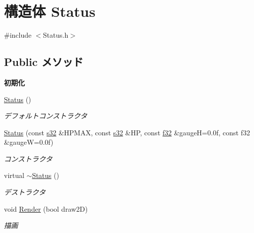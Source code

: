 \hypertarget{struct_status}{\section{構造体 Status}
\label{struct_status}
}


{\ttfamily \#include $<$Status.\-h$>$}

\subsection*{Public メソッド}
\begin{Indent}{\bf 初期化}\par
\begin{DoxyCompactItemize}
\item 
\hyperlink{struct_status_a944586fb328a3524805748c8f7b17f32}{Status} ()
\begin{DoxyCompactList}\small\item\em デフォルトコンストラクタ \end{DoxyCompactList}\item 
\hyperlink{struct_status_ab95acb11b5615a33278ccdfe0aa5bcb0}{Status} (const \hyperlink{_main_8h_a0ce6887c26c1c49ad3be5710dd42bfd6}{s32} \&H\-P\-M\-A\-X, const \hyperlink{_main_8h_a0ce6887c26c1c49ad3be5710dd42bfd6}{s32} \&H\-P, const \hyperlink{_main_8h_a5f6906312a689f27d70e9d086649d3fd}{f32} \&gauge\-H=0.\-0f, const f32 \&gauge\-W=0.\-0f)
\begin{DoxyCompactList}\small\item\em コンストラクタ \end{DoxyCompactList}\item 
virtual \hyperlink{struct_status_a5955d4b2cbbf59287c76e20e2b42fcc8}{$\sim$\-Status} ()
\begin{DoxyCompactList}\small\item\em デストラクタ \end{DoxyCompactList}\item 
void \hyperlink{struct_status_a970ae8bd6adabc224c83a8df0bdd99e7}{Render} (bool draw2\-D)
\begin{DoxyCompactList}\small\item\em 描画 \end{DoxyCompactList}\end{DoxyCompactItemize}
\end{Indent}
